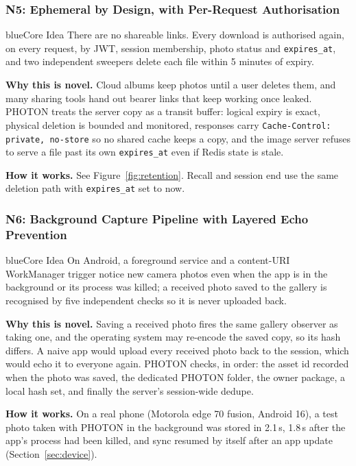 \subsubsection{N5: Ephemeral by Design, with Per-Request Authorisation}

\begin{pbox}{blue}{Core Idea}
There are no shareable links. Every download is authorised again, on every request, by JWT, session membership, photo status and \texttt{expires\_at}, and two independent sweepers delete each file within 5 minutes of expiry.
\end{pbox}

\textbf{Why this is novel.} Cloud albums keep photos until a user deletes them, and many sharing tools hand out bearer links that keep working once leaked. PHOTON treats the server copy as a transit buffer: logical expiry is exact, physical deletion is bounded and monitored, responses carry \texttt{Cache-Control: private, no-store} so no shared cache keeps a copy, and the image server refuses to serve a file past its own \texttt{expires\_at} even if Redis state is stale.

\textbf{How it works.} See Figure~\ref{fig:retention}. Recall and session end use the same deletion path with \texttt{expires\_at} set to now.

\subsubsection{N6: Background Capture Pipeline with Layered Echo Prevention}

\begin{pbox}{blue}{Core Idea}
On Android, a foreground service and a content-URI WorkManager trigger notice new camera photos even when the app is in the background or its process was killed; a received photo saved to the gallery is recognised by five independent checks so it is never uploaded back.
\end{pbox}

\textbf{Why this is novel.} Saving a received photo fires the same gallery observer as taking one, and the operating system may re-encode the saved copy, so its hash differs. A naive app would upload every received photo back to the session, which would echo it to everyone again. PHOTON checks, in order: the asset id recorded when the photo was saved, the dedicated PHOTON folder, the owner package, a local hash set, and finally the server's session-wide dedupe.

\textbf{How it works.} On a real phone (Motorola edge 70 fusion, Android 16), a test photo taken with PHOTON in the background was stored in 2.1\,s, 1.8\,s after the app's process had been killed, and sync resumed by itself after an app update (Section~\ref{sec:device}).
